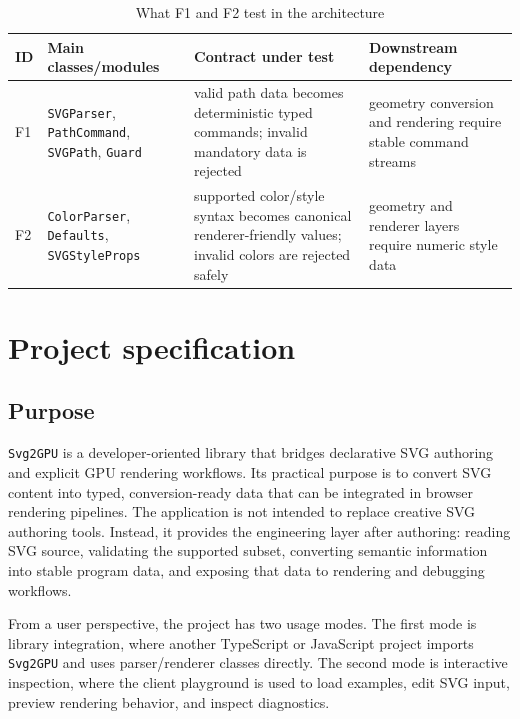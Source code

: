 \begin{table}[htbp]
\centering
\caption{What F1 and F2 test in the architecture}
\label{tab:f1_f2_architecture_focus}
\begin{tabular}{>{\raggedright\arraybackslash}p{1.4cm} >{\raggedright\arraybackslash}p{3.0cm} >{\raggedright\arraybackslash}p{4.3cm} >{\raggedright\arraybackslash}p{4.0cm}}
\toprule
\textbf{ID} & \textbf{Main classes/modules} & \textbf{Contract under test} & \textbf{Downstream dependency} \\
\midrule
F1 & \texttt{SVGParser}, \texttt{PathCommand}, \texttt{SVGPath}, \texttt{Guard} & valid path data becomes deterministic typed commands; invalid mandatory data is rejected & geometry conversion and rendering require stable command streams \\
F2 & \texttt{ColorParser}, \texttt{Defaults}, \texttt{SVGStyleProps} & supported color/style syntax becomes canonical renderer-friendly values; invalid colors are rejected safely & geometry and renderer layers require numeric style data \\
\bottomrule
\end{tabular}
\end{table}

\section{Project specification}

\subsection{Purpose}

\texttt{Svg2GPU} is a developer-oriented library that bridges declarative SVG authoring and explicit GPU rendering workflows.
Its practical purpose is to convert SVG content into typed, conversion-ready data that can be integrated in browser rendering pipelines.
The application is not intended to replace creative SVG authoring tools.
Instead, it provides the engineering layer after authoring: reading SVG source, validating the supported subset, converting semantic information into stable program data, and exposing that data to rendering and debugging workflows.

From a user perspective, the project has two usage modes.
The first mode is library integration, where another TypeScript or JavaScript project imports \texttt{Svg2GPU} and uses parser/renderer classes directly.
The second mode is interactive inspection, where the client playground is used to load examples, edit SVG input, preview rendering behavior, and inspect diagnostics.

